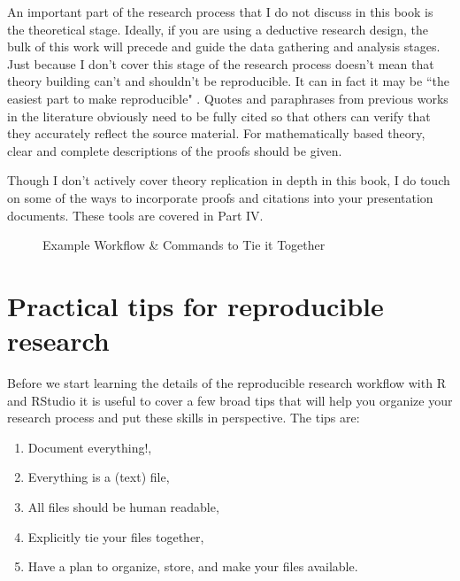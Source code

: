 An important part of the research process that I do not discuss in this book is the theoretical stage. Ideally, if you are using a deductive research design, the bulk of this work will precede and guide the data gathering and analysis stages. Just because I don't cover this stage of the research process doesn't mean that theory building can't and shouldn't be reproducible. It can in fact it may be ``the easiest part to make reproducible" \cite[1254]{Vandewalle2007}. Quotes and paraphrases from previous works in the literature obviously need to be fully cited so that others can verify that they accurately reflect the source material. For mathematically based theory, clear and complete descriptions of the proofs should be given. 

Though I don't actively cover theory replication in depth in this book, I do touch on some of the ways to incorporate proofs and citations into your presentation documents. These tools are covered in Part IV.

\thispagestyle{plain}
\begin{landscape}
    \begin{center}
        \begin{figure}[th!]
            \caption{Example Workflow \& Commands to Tie it Together}
            \label{WorkflowTies}
            
        \end{figure}
    \end{center}
\end{landscape}

\section{Practical tips for reproducible research}

Before we start learning the details of the reproducible research workflow with R and RStudio it is useful to cover a few broad tips that will help you organize your research process and put these skills in perspective. The tips are:

\begin{enumerate}
    \item Document everything!,
    \item Everything is a (text) file,
    \item All files should be human readable,
    \item Explicitly tie your files together,
    \item Have a plan to organize, store, and make your files available.    
\end{enumerate}

